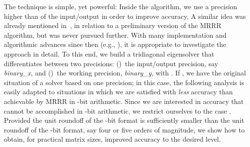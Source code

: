 \documentclass[final]{siamltex}
\newcommand{\binaryx}{{\it binary\_\hspace*{1pt}x}}
\newcommand{\binaryy}{{\it binary\_\hspace*{0pt}y}}
\begin{document}
The technique is simple, yet powerful: Inside the algorithm, 
we use a precision higher than of the input/output in order to improve accuracy. 
A similar idea was already mentioned in~\cite{Dhillon:Diss},
in relation to a preliminary version of the MRRR algorithm,
but was never pursued further.
With many implementation and algorithmic advances since then (e.g.,
\cite{NLA:NLA493,Dhillon05gluedmatrices,Bientinesi:2005:PMR3,Willems:twisted,Willems:blocked}),  
it is appropriate to  
investigate the approach in detail.
To this end, we build a tridiagonal eigensolver that 
differentiates between two precisions: ()~the  
input/output precision, say \binaryx, and ()~the working precision,
\binaryy, with . If , we have the original 
situation of a solver based on one precision; in this case, the following analysis
is easily adapted to situations in which we are satisfied with {\em less} accuracy
than achievable by MRRR in -bit arithmetic. Since we are interested in accuracy that
cannot be accomplished in -bit arithmetic, we
restrict ourselves to the case . Provided the unit roundoff of the -bit format is
sufficiently smaller than the unit roundoff of the -bit format, say four
or five orders of magnitude, we show how to obtain, for practical matrix sizes, improved
accuracy to the desired level. 
\end{document}
